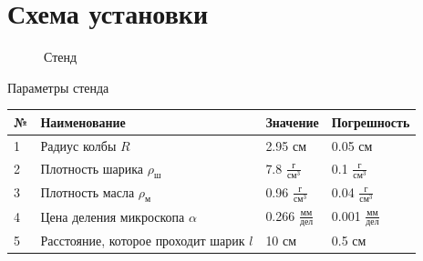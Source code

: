 \documentclass[a4paper]{article}
\begin{document}
\section{Схема установки}

\begin{figure}[h!]
\begin{minipage}[h]{0.49\linewidth}
\end{minipage}
\hfill
\begin{minipage}[h]{0.49\linewidth}
\end{minipage}
\caption{Стенд}
\label{stend}
\end{figure}


$\textbf{Параметры стенда}$\\
\begin{tabular}{l | l | l | l }\hline
№ & Наименование & Значение & Погрешность \\ \hline
1 & Радиус колбы $R$ & 2.95 см & 0.05 см \\
2 & Плотность шарика $\rho_ш$ & 7.8 $\frac{г}{см^3}$ & 0.1 $\frac{г}{см^3}$ \\
3 & Плотность масла $\rho_м$ & 0.96 $\frac{г}{см^3}$ & 0.04 $\frac{г}{см^3}$ \\
4 & Цена деления микроскопа $\alpha$ & 0.266 $\frac{мм}{дел}$ & 0.001 $\frac{мм}{дел}$ \\
5 & Расстояние, которое проходит шарик $l$ & 10 см & 0.5 см \\
\end{tabular}
\end{document}
